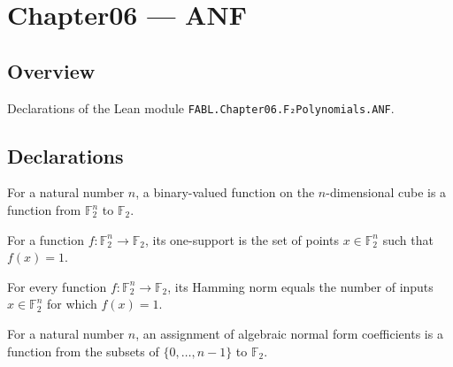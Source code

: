 \chapter{Chapter06 — ANF}
\section{Overview}

Declarations of the Lean module \texttt{FABL.Chapter06.F₂Polynomials.ANF}.

\section{Declarations}

\begin{definition}
\leanok
{}
For a natural number $n$, a binary-valued function on the $n$-dimensional cube is a
function from $\mathbb F_2^n$ to $\mathbb F_2$.
\end{definition}

\begin{definition}
\leanok
{}
For a function $f:\mathbb F_2^n\to\mathbb F_2$, its one-support is the set of points
$x\in\mathbb F_2^n$ such that $f(x)=1$.
\end{definition}

\begin{theorem}
\leanok
{}
For every function $f:\mathbb F_2^n\to\mathbb F_2$, its Hamming norm equals the number
of inputs $x\in\mathbb F_2^n$ for which $f(x)=1$.
\end{theorem}

\begin{definition}
\label{FABL.ANFCoefficients}
\leanok
{}
For a natural number $n$, an assignment of algebraic normal form coefficients is a
function from the subsets of $\{0,\ldots,n-1\}$ to $\mathbb F_2$.
\end{definition}

